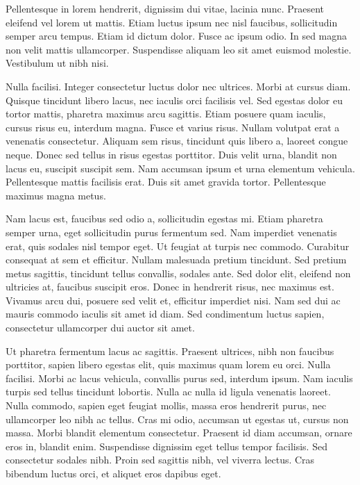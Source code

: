 \documentclass[12pt]{article}
\begin{document}
Pellentesque in lorem hendrerit, dignissim dui vitae, lacinia nunc. Praesent eleifend vel lorem ut mattis. Etiam luctus ipsum nec nisl faucibus, sollicitudin semper arcu tempus. Etiam id dictum dolor. Fusce ac ipsum odio. In sed magna non velit mattis ullamcorper. Suspendisse aliquam leo sit amet euismod molestie. Vestibulum ut nibh nisi.

Nulla facilisi. Integer consectetur luctus dolor nec ultrices. Morbi at cursus diam. Quisque tincidunt libero lacus, nec iaculis orci facilisis vel. Sed egestas dolor eu tortor mattis, pharetra maximus arcu sagittis. Etiam posuere quam iaculis, cursus risus eu, interdum magna. Fusce et varius risus. Nullam volutpat erat a venenatis consectetur. Aliquam sem risus, tincidunt quis libero a, laoreet congue neque. Donec sed tellus in risus egestas porttitor. Duis velit urna, blandit non lacus eu, suscipit suscipit sem. Nam accumsan ipsum et urna elementum vehicula. Pellentesque mattis facilisis erat. Duis sit amet gravida tortor. Pellentesque maximus magna metus.

Nam lacus est, faucibus sed odio a, sollicitudin egestas mi. Etiam pharetra semper urna, eget sollicitudin purus fermentum sed. Nam imperdiet venenatis erat, quis sodales nisl tempor eget. Ut feugiat at turpis nec commodo. Curabitur consequat at sem et efficitur. Nullam malesuada pretium tincidunt. Sed pretium metus sagittis, tincidunt tellus convallis, sodales ante. Sed dolor elit, eleifend non ultricies at, faucibus suscipit eros. Donec in hendrerit risus, nec maximus est. Vivamus arcu dui, posuere sed velit et, efficitur imperdiet nisi. Nam sed dui ac mauris commodo iaculis sit amet id diam. Sed condimentum luctus sapien, consectetur ullamcorper dui auctor sit amet.

Ut pharetra fermentum lacus ac sagittis. Praesent ultrices, nibh non faucibus porttitor, sapien libero egestas elit, quis maximus quam lorem eu orci. Nulla facilisi. Morbi ac lacus vehicula, convallis purus sed, interdum ipsum. Nam iaculis turpis sed tellus tincidunt lobortis. Nulla ac nulla id ligula venenatis laoreet. Nulla commodo, sapien eget feugiat mollis, massa eros hendrerit purus, nec ullamcorper leo nibh ac tellus. Cras mi odio, accumsan ut egestas ut, cursus non massa. Morbi blandit elementum consectetur. Praesent id diam accumsan, ornare eros in, blandit enim. Suspendisse dignissim eget tellus tempor facilisis. Sed consectetur sodales nibh. Proin sed sagittis nibh, vel viverra lectus. Cras bibendum luctus orci, et aliquet eros dapibus eget.
\end{document}
